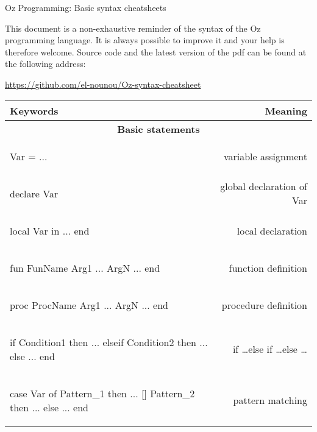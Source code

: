 \documentclass[12pt]{article}
\author{Felten Florian}
\begin{document}
\vspace*{2em}
\begin{center} %
	{\Large Oz Programming: Basic syntax cheatsheets}
\end{center}

This document is a non-exhaustive reminder of the syntax of the Oz programming language. It is always possible to improve it and your help is therefore welcome. Source code and the latest version of the pdf can be found at the following address:
\begin{center}
\url{https://github.com/el-nounou/Oz-syntax-cheatsheet}
\end{center}

\begin{longtable}{l r}
\toprule[0.2em]
\multicolumn{1}{l}{\textbf{Keywords}} & \textbf{Meaning}\\
\midrule


\multicolumn{2}{c}{\textbf{Basic statements}}\\

\begin{oz}
Var = ...
\end{oz}
&variable assignment\\

\begin{oz}
declare Var 
\end{oz}
&global declaration of Var\\
 
\begin{oz}
local Var in 
	...
end
\end{oz}
&local declaration\\
 
 
\begin{oz}
fun {FunName Arg1 ... ArgN}
	...
end
\end{oz}
&function definition\\
 
\begin{oz}
proc {ProcName Arg1 ... ArgN}
	...
end
\end{oz}
&procedure definition\\

\begin{oz}
if Condition1 then
	...
elseif Condition2 then 
	...
else
	...
end
\end{oz}
&if \dots else if \dots else \dots \\
 
 
\begin{oz}
case Var of Pattern_1 then ...
[] Pattern_2 then ...
else ...
end
\end{oz}
&pattern matching \\[0.4em]




\end{longtable}
\end{document}
